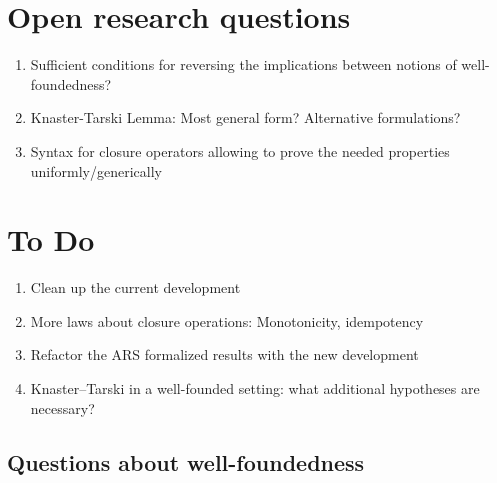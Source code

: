 \documentclass{scrartcl}
\begin{document}
\section{Open research questions}
\begin{enumerate}
  \item Sufficient conditions for reversing the implications between notions of
  well-foundedness?
  \item Knaster-Tarski Lemma: Most general form? Alternative formulations?
  \item Syntax for closure operators allowing to prove the needed properties
  uniformly/generically
\end{enumerate}

\section{To Do}
\begin{enumerate}
  \item Clean up the current development
  \item More laws about closure operations: Monotonicity, idempotency
  \item Refactor the ARS formalized results with the new development
  \item Knaster--Tarski in a well-founded setting: what additional
  hypotheses are necessary?
\end{enumerate}

\subsection{Questions about well-foundedness}
\end{document}
